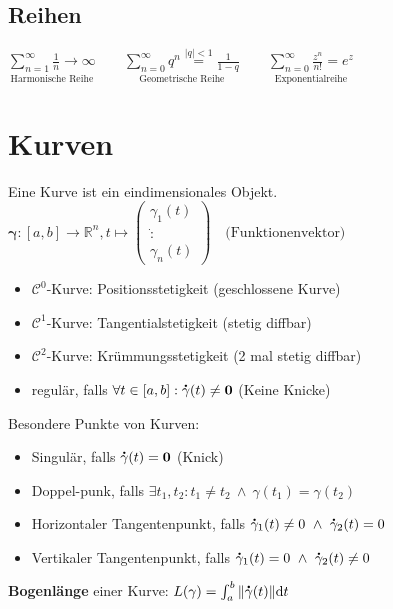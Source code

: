 \documentclass[6pt,a4paper]{scrartcl}
\let\olddot = \dot
\newcommand{\norm}[1]{\ensuremath{\|#1\|}}                                                      %
\newcommand{\svdots}{\ensuremath{\olddot :}}                                                    %
\renewcommand{\vec}[1]{\ensuremath{\boldsymbol {#1}}}                                           %
\renewcommand{\emph}[1]{\textbf{#1}}                                                            %
\renewcommand*{\dot}[1]{\accentset{\mbox{\textrm{\large\bfseries .}} }{#1}}                     %
\newcommand{\ra}[0]{\ensuremath{\rightarrow}}                                  %
\begin{document}
\begin{multicols*}{4}
    \subsection{Reihen}

    $\underset{\text{Harmonische Reihe}}{\sum\limits_{n=1}^\infty \frac{1}{n} \ra \infty} \qquad   \underset{\text{Geometrische Reihe}}{\sum\limits_{n=0}^\infty q^n \stackrel{|q|<1}= \frac{1}{1-q}}  \qquad \underset{\text{Exponentialreihe}}{\sum\limits_{n = 0}^{\infty} \frac{z^n}{n!} = e^z}$

    \section{Kurven}
    Eine Kurve ist ein eindimensionales Objekt.\\
    $ \vec \gamma:[a,b] \rightarrow \mathbb R^n, t \mapsto \begin{pmatrix} \gamma_1(t) \\ \svdots \\ \gamma_n(t) \end{pmatrix} \quad \text{(Funktionenvektor)} $
    \begin{itemize}\itemsep-2pt
        \item $\mathcal C^0$-Kurve: Positionsstetigkeit (geschlossene Kurve)
        \item $\mathcal C^1$-Kurve: Tangentialstetigkeit (stetig diffbar)
        \item $\mathcal C^2$-Kurve: Krümmungsstetigkeit (2 mal stetig diffbar)
        \item regulär, falls $\forall t \in [a,b]:\dot \gamma(t) \ne \vec 0$ (Keine Knicke)
    \end{itemize}
    Besondere Punkte von Kurven:
    \begin{itemize}\itemsep-2pt
        \item Singulär, falls $\dot \gamma(t)=\vec 0$ (Knick)
        \item Doppel-punk, falls $\exists t_1,t_2:t_1 \ne t_2 \ \land \ \gamma(t_1)=\gamma(t_2)$
        \item Horizontaler Tangentenpunkt, falls $\dot \gamma_1(t) \ne 0 \ \land \ \dot \gamma_2(t)=0$
        \item Vertikaler Tangentenpunkt, falls $\dot \gamma_1(t) = 0 \ \land \ \dot \gamma_2(t) \ne 0$
    \end{itemize}
    \emph{Bogenlänge} einer Kurve: $L(\gamma) = \int_{a}^{b} \norm{\dot \gamma(t)} \mathrm dt$ \\



\end{multicols*}
\end{document}
